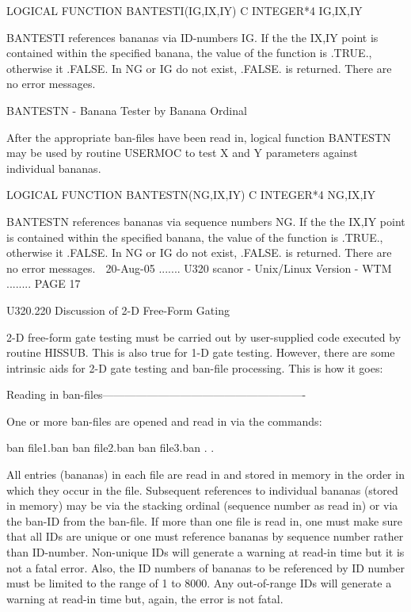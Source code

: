          LOGICAL FUNCTION BANTESTI(IG,IX,IY)
   C
         INTEGER*4 IG,IX,IY
 
   BANTESTI references bananas via ID-numbers IG. If the the  IX,IY  point  is
   contained  within  the  specified  banana,  the  value  of  the function is
   .TRUE., otherwise it  .FALSE.  In  NG  or  IG  do  not  exist,  .FALSE.  is
   returned. There are no error messages.
 
 
   BANTESTN - Banana Tester by Banana Ordinal
 
   After  the  appropriate  ban-files  have  been  read  in,  logical function
   BANTESTN may be used by routine USERMOC to test X and Y parameters  against
   individual bananas.
 
         LOGICAL FUNCTION BANTESTN(NG,IX,IY)
   C
         INTEGER*4 NG,IX,IY
 
   BANTESTN  references  bananas  via  sequence  numbers  NG. If the the IX,IY
   point is contained within the specified banana, the value of  the  function
   is  .TRUE.,  otherwise  it  .FALSE.  In  NG  or IG do not exist, .FALSE. is
   returned. There are no error messages.
    
   20-Aug-05 ....... U320  scanor - Unix/Linux Version - WTM ........ PAGE  17
 
 
   U320.220  Discussion of 2-D Free-Form Gating
 
   2-D free-form gate testing  must  be  carried  out  by  user-supplied  code
   executed  by  routine  HISSUB.  This  is  also  true  for 1-D gate testing.
   However, there are some intrinsic aids for 2-D gate  testing  and  ban-file
   processing. This is how it goes:
 
   Reading in ban-files-------------------------------------------------------
 
   One or more ban-files are opened and read in via the commands:
 
   ban file1.ban
   ban file2.ban
   ban file3.ban
        .
        .
 
   All  entries (bananas) in each file are read in and stored in memory in the
   order in which they occur in the file. Subsequent references to  individual
   bananas  (stored  in  memory)  may  be  via  the stacking ordinal (sequence
   number as read in) or via the ban-ID from the ban-file. If  more  than  one
   file  is  read  in,  one must make sure that all IDs are unique or one must
   reference bananas by sequence number rather than ID-number. Non-unique  IDs
   will  generate a warning at read-in time but it is not a fatal error. Also,
   the ID numbers of bananas to be referenced by ID number must be limited  to
   the  range  of  1  to 8000. Any out-of-range IDs will generate a warning at
   read-in time but, again, the error is not fatal.
 
